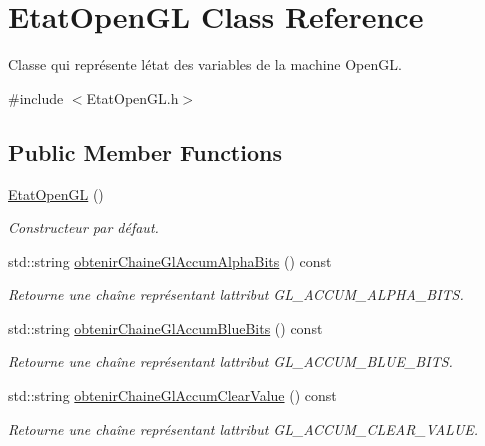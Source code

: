 \hypertarget{class_etat_open_g_l}{}\section{Etat\+Open\+G\+L Class Reference}
\label{class_etat_open_g_l}


Classe qui représente l\textquotesingle{}état des variables de la machine Open\+G\+L.  




{\ttfamily \#include $<$Etat\+Open\+G\+L.\+h$>$}

\subsection*{Public Member Functions}
\begin{DoxyCompactItemize}
\item 
\hyperlink{group__utilitaire_gaf682f61929f2502b08b6b88de07349b6}{Etat\+Open\+G\+L} ()
\begin{DoxyCompactList}\small\item\em Constructeur par défaut. \end{DoxyCompactList}\item 
std\+::string \hyperlink{group__utilitaire_ga13c8aaca9f02431b47b83e36b18f8067}{obtenir\+Chaine\+Gl\+Accum\+Alpha\+Bits} () const 
\begin{DoxyCompactList}\small\item\em Retourne une chaîne représentant l\textquotesingle{}attribut G\+L\+\_\+\+A\+C\+C\+U\+M\+\_\+\+A\+L\+P\+H\+A\+\_\+\+B\+I\+T\+S. \end{DoxyCompactList}\item 
std\+::string \hyperlink{group__utilitaire_ga695387ee2d838c97214c70219d52da10}{obtenir\+Chaine\+Gl\+Accum\+Blue\+Bits} () const 
\begin{DoxyCompactList}\small\item\em Retourne une chaîne représentant l\textquotesingle{}attribut G\+L\+\_\+\+A\+C\+C\+U\+M\+\_\+\+B\+L\+U\+E\+\_\+\+B\+I\+T\+S. \end{DoxyCompactList}\item 
std\+::string \hyperlink{group__utilitaire_gaf3e85f5f434e93aa09376200f3c837ae}{obtenir\+Chaine\+Gl\+Accum\+Clear\+Value} () const 
\begin{DoxyCompactList}\small\item\em Retourne une chaîne représentant l\textquotesingle{}attribut G\+L\+\_\+\+A\+C\+C\+U\+M\+\_\+\+C\+L\+E\+A\+R\+\_\+\+V\+A\+L\+U\+E. \end{DoxyCompactList}\item 

\end{DoxyCompactItemize}
